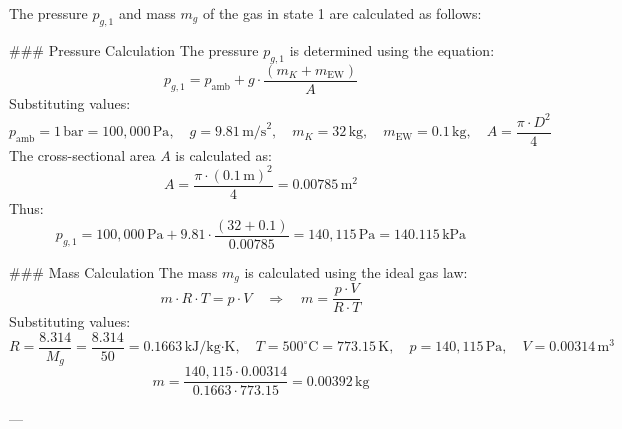 The pressure \( p_{g,1} \) and mass \( m_g \) of the gas in state 1 are calculated as follows:  

### Pressure Calculation  
The pressure \( p_{g,1} \) is determined using the equation:  
\[
p_{g,1} = p_{\text{amb}} + g \cdot \frac{(m_K + m_{\text{EW}})}{A}
\]  
Substituting values:  
\[
p_{\text{amb}} = 1 \, \text{bar} = 100,000 \, \text{Pa}, \quad g = 9.81 \, \text{m/s}^2, \quad m_K = 32 \, \text{kg}, \quad m_{\text{EW}} = 0.1 \, \text{kg}, \quad A = \frac{\pi \cdot D^2}{4}
\]  
The cross-sectional area \( A \) is calculated as:  
\[
A = \frac{\pi \cdot (0.1 \, \text{m})^2}{4} = 0.00785 \, \text{m}^2
\]  
Thus:  
\[
p_{g,1} = 100,000 \, \text{Pa} + 9.81 \cdot \frac{(32 + 0.1)}{0.00785} = 140,115 \, \text{Pa} = 140.115 \, \text{kPa}
\]  

### Mass Calculation  
The mass \( m_g \) is calculated using the ideal gas law:  
\[
m \cdot R \cdot T = p \cdot V \quad \Rightarrow \quad m = \frac{p \cdot V}{R \cdot T}
\]  
Substituting values:  
\[
R = \frac{8.314}{M_g} = \frac{8.314}{50} = 0.1663 \, \text{kJ/kg·K}, \quad T = 500^\circ\text{C} = 773.15 \, \text{K}, \quad p = 140,115 \, \text{Pa}, \quad V = 0.00314 \, \text{m}^3
\]  
\[
m = \frac{140,115 \cdot 0.00314}{0.1663 \cdot 773.15} = 0.00392 \, \text{kg}
\]  

---